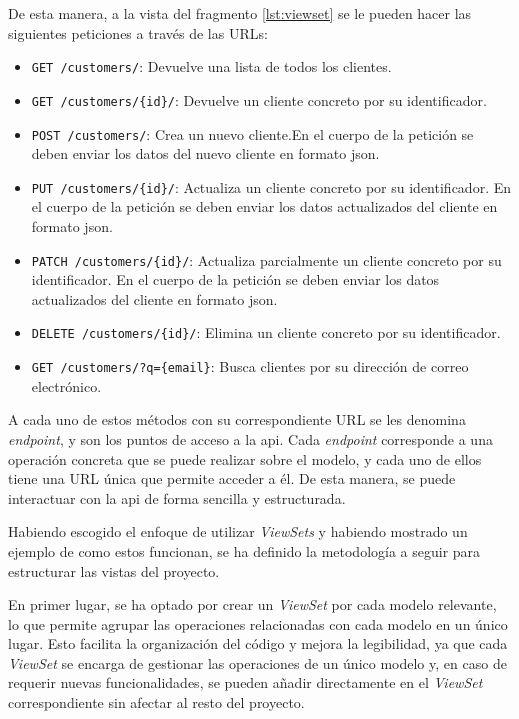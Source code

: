 De esta manera, a la vista del fragmento \ref{lst:viewset} se le pueden hacer las siguientes peticiones a través de las URLs:

\begin{itemize}
    \item \texttt{GET /customers/}: Devuelve una lista de todos los clientes.
    \item \texttt{GET /customers/\{id\}/}: Devuelve un cliente concreto por su identificador.
    \item \texttt{POST /customers/}: Crea un nuevo cliente.En el cuerpo de la petición se deben enviar los datos del nuevo cliente en formato \gls{json}.
    \item \texttt{PUT /customers/\{id\}/}: Actualiza un cliente concreto por su identificador. En el cuerpo de la petición se deben enviar los datos actualizados del cliente en formato \gls{json}.
    \item \texttt{PATCH /customers/\{id\}/}: Actualiza parcialmente un cliente concreto por su identificador. En el cuerpo de la petición se deben enviar los datos actualizados del cliente en formato \gls{json}.
    \item \texttt{DELETE /customers/\{id\}/}: Elimina un cliente concreto por su identificador.
    \item \texttt{GET /customers/?q=\{email\}}: Busca clientes por su dirección de correo electrónico.
\end{itemize}

A cada uno de estos métodos con su correspondiente URL se les denomina \textit{endpoint}, y son los puntos de acceso a la \gls{api}. Cada \textit{endpoint} corresponde a una operación concreta que se puede realizar sobre el modelo, y cada uno de ellos tiene una URL única que permite acceder a él. De esta manera, se puede interactuar con la \gls{api} de forma sencilla y estructurada.

Habiendo escogido el enfoque de utilizar \textit{ViewSets} y habiendo mostrado un ejemplo de como estos funcionan, se ha definido la metodología a seguir para estructurar las vistas del proyecto.

En primer lugar, se ha optado por crear un \textit{ViewSet} por cada modelo relevante, lo que permite agrupar las operaciones relacionadas con cada modelo en un único lugar. Esto facilita la organización del código y mejora la legibilidad, ya que cada \textit{ViewSet} se encarga de gestionar las operaciones de un único modelo y, en caso de requerir nuevas funcionalidades, se pueden añadir directamente en el \textit{ViewSet} correspondiente sin afectar al resto del proyecto.

